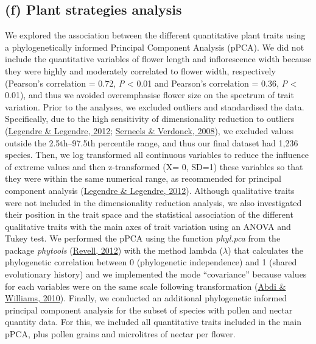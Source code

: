 \documentclass[
  12pt,
  a4paper,
]{article}
\begin{document}
\hypertarget{f-plant-strategies-analysis}{%
\subsection{(f) Plant strategies analysis}\label{f-plant-strategies-analysis}}

We explored the association between the different quantitative plant traits using a phylogenetically informed Principal Component Analysis (pPCA). We did not include the quantitative variables of flower length and inflorescence width because they were highly and moderately correlated to flower width, respectively (Pearson's correlation = 0.72, \emph{P} \textless{} 0.01 and Pearson's correlation = 0.36, \emph{P} \textless{} 0.01), and thus we avoided overemphasise flower size on the spectrum of trait variation. Prior to the analyses, we excluded outliers and standardised the data. Specifically, due to the high sensitivity of dimensionality reduction to outliers (\protect\hyperlink{ref-legendre2012}{Legendre \& Legendre, 2012}; \protect\hyperlink{ref-serneels2008}{Serneels \& Verdonck, 2008}), we excluded values outside the 2.5th--97.5th percentile range, and thus our final dataset had 1,236 species. Then, we log transformed all continuous variables to reduce the influence of extreme values and then z-transformed (X= 0, SD=1) these variables so that they were within the same numerical range, as recommended for principal component analysis (\protect\hyperlink{ref-legendre2012}{Legendre \& Legendre, 2012}). Although qualitative traits were not included in the dimensionality reduction analysis, we also investigated their position in the trait space and the statistical association of the different qualitative traits with the main axes of trait variation using an ANOVA and Tukey test. We performed the pPCA using the function \emph{phyl.pca} from the package \emph{phytools} (\protect\hyperlink{ref-revell2012}{Revell, 2012}) with the method lambda (\(\lambda\)) that calculates the phylogenetic correlation between 0 (phylogenetic independence) and 1 (shared evolutionary history) and we implemented the mode ``covariance'' because values for each variables were on the same scale following transformation (\protect\hyperlink{ref-abdi2010}{Abdi \& Williams, 2010}). Finally, we conducted an additional phylogenetic informed principal component analysis for the subset of species with pollen and nectar quantity data. For this, we included all quantitative traits included in the main pPCA, plus pollen grains and microlitres of nectar per flower.
\end{document}
